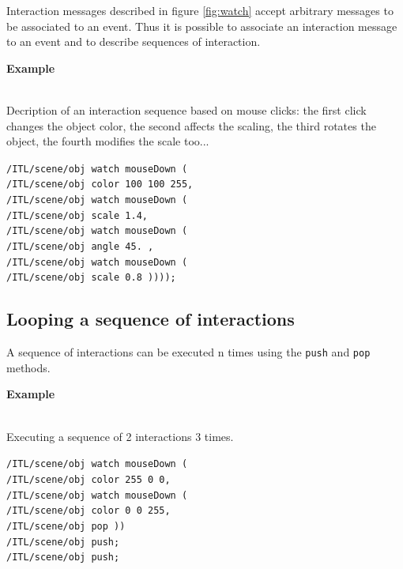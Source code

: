\documentclass{article}
\newcommand{\code}[1]		{\texttt{\small #1}}
\newcounter{excount}
\newcommand{\exemple}			{\vspace{1mm} \hspace*{-4.5mm}\textbf{Example \arabic{excount}} \addtocounter{excount}{1}}
\newcommand{\sample}	[1]		{\begin{center}\colorbox{mygrey}{
								\begin{minipage}[t]{0.95\columnwidth} 
								{\small \texttt{#1}}
								\end{minipage}}\end{center}}
\begin{document}
Interaction messages described in figure \ref{fig:watch} accept arbitrary messages to be associated to an event. Thus it is possible to associate an interaction message to an event and to describe sequences of interaction.

\exemple   \\
Decription of an interaction sequence based  on mouse clicks: the first click changes the object color, the second affects the scaling, the third rotates the object, the fourth modifies the scale too... 
\sample{/ITL/scene/obj watch mouseDown ( 		\\
\hspace*{4mm}/ITL/scene/obj color 100 100 255,	\\
\hspace*{4mm}/ITL/scene/obj watch mouseDown (		\\
\hspace*{8mm}/ITL/scene/obj scale 1.4,			\\
\hspace*{8mm}/ITL/scene/obj watch mouseDown ( \\
\hspace*{12mm}/ITL/scene/obj angle 45. ,	 \\
\hspace*{12mm}/ITL/scene/obj watch mouseDown ( \\
\hspace*{16mm}/ITL/scene/obj scale 0.8 ))));
}

\subsection{Looping a sequence of interactions} \label{seqloop}
A sequence of interactions can be executed n times using the \code{push} and \code{pop} methods.

\exemple \\
Executing a sequence of 2 interactions 3 times.
\sample{/ITL/scene/obj watch mouseDown ( 		\\
\hspace*{4mm}/ITL/scene/obj color 255 0 0,	\\
\hspace*{4mm}/ITL/scene/obj watch mouseDown (		\\
\hspace*{8mm}/ITL/scene/obj color 0 0 255,	\\
\hspace*{8mm}/ITL/scene/obj pop ))	\\
/ITL/scene/obj push; \\
/ITL/scene/obj push;
} 
\end{document}
